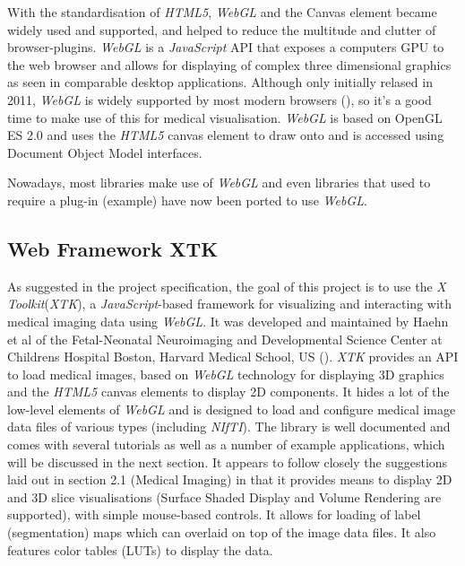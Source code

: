 \documentclass[a4paper,11pt,titlepage]{article}
\begin{document}
With the standardisation of \textit{HTML5}, \textit{WebGL} and the Canvas element became widely used and supported, and helped to reduce the multitude and clutter of browser-plugins. \textit{WebGL} is a \textit{JavaScript} API that exposes a computers GPU to the web browser and allows for displaying of complex three dimensional graphics as seen in comparable desktop applications. Although only initially relased in 2011, \textit{WebGL} is widely supported by most modern browsers (\cite{webGL}), so it's a good time to make use of this for medical visualisation. \textit{WebGL} is based on OpenGL ES 2.0 and uses the \textit{HTML5} canvas element to draw onto and is accessed using Document Object Model interfaces.

Nowadays, most libraries make use of \textit{WebGL} and even libraries that used to require a plug-in (example) have now been ported to use \textit{WebGL}. 




\subsection{Web Framework XTK}

As suggested in the project specification, the goal of this project is to use the \textit{X Toolkit}(\textit{XTK}), a \textit{JavaScript}-based framework for visualizing and interacting with medical imaging data using \textit{WebGL}. It was developed and maintained by Haehn et al of the Fetal-Neonatal Neuroimaging and Developmental Science Center at Childrens Hospital Boston, Harvard Medical School, US (\cite{xtk}). \textit{XTK} provides an API to load medical images, based on \textit{WebGL} technology for displaying 3D graphics and the \textit{HTML5} canvas elements to display 2D components. It hides a lot of the low-level elements of \textit{WebGL} and is designed to load and configure medical image data files of various types (including \textit{NIfTI}). The library is well documented and comes with several tutorials as well as a number of example applications, which will be discussed in the next section. It appears to follow closely the suggestions laid out in section 2.1 (Medical Imaging) in that it provides means to display 2D and 3D slice visualisations (Surface Shaded Display and Volume Rendering are supported), with simple mouse-based controls. It allows for loading of label (segmentation) maps which can overlaid on top of the image data files. It also features color tables (LUTs) to display the data.
\end{document}
